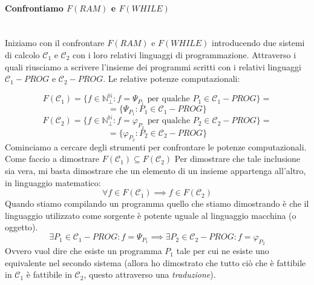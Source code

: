 \documentclass{article}
\begin{document}
\paragraph{Confrontiamo $F(RAM)$ e $F(WHILE)$}\mbox{}\\
Iniziamo con il confrontare $F(RAM)$ e $F(WHILE)$ introducendo due sistemi di calcolo $\mathcal{C}_1$ e $\mathcal{C}_2$
con i loro relativi linguaggi di programmazione. Attraverso i quali riusciamo a scrivere l'insieme dei
programmi scritti con i relativi linguaggi $\mathcal{C}_1-PROG$ e $\mathcal{C}_2-PROG$. Le relative
potenze computazionali:

$$F(\mathcal{C}_1)=\{f\in\mathbb{N}_\bot^\mathbb{N}: f=\Psi_{P_1}\text{ per qualche }P_1\in\mathcal{C}_1-PROG\}=$$
$$=\{\Psi_{P_1}:P_1\in\mathcal{C}_1-PROG\}$$
$$F(\mathcal{C}_2)=\{f\in\mathbb{N}_\bot^\mathbb{N}: f=\varphi_{P_2}\text{ per qualche }P_2\in\mathcal{C}_2-PROG\}=$$
$$=\{\varphi_{P_2}:P_2\in\mathcal{C}_2-PROG\}$$
Cominciamo a cercare degli strumenti per confrontare le potenze computazionali. Come faccio a dimostrare
$F(\mathcal{C}_1)\subseteq F(\mathcal{C}_2)$
Per dimostrare che tale inclusione sia vera, mi basta dimostrare che un elemento di un insieme appartenga
all'altro, in linguaggio matematico:
$$\forall f\in F(\mathcal{C}_1)\implies f\in F(\mathcal{C}_2)$$
Quando stiamo compilando un programma quello che stiamo dimostrando è che il linguaggio utilizzato
come sorgente è potente uguale al linguaggio macchina (o oggetto).
$$\exists P_1\in\mathcal{C}_1-PROG : f=\Psi_{P_1}\implies\exists P_2\in\mathcal{C}_2-PROG:f=\varphi_{P_2}$$
Ovvero vuol dire che esiste un programma $P_1$ tale per cui ne esiste uno equivalente nel secondo
sistema (allora ho dimostrato che tutto ciò che è fattibile in $\mathcal{C}_1$ è fattibile in $\mathcal{C}_2$,
questo attraverso una \textit{traduzione}).
\end{document}
